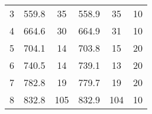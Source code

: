 \begin{table}[H]
\begin{tabular}{@{}cccccc@{}}
3                                 & 559.8                                                                                     & 35                                     & 558.9                                                                                     & 35                                     & 10                                                                                        \\
4                                 & 664.6                                                                                     & 30                                     & 664.9                                                                                     & 31                                     & 10                                                                                        \\
5                                 & 704.1                                                                                     & 14                                     & 703.8                                                                                     & 15                                     & 20                                                                                        \\
6                                 & 740.5                                                                                     & 14                                     & 739.1                                                                                     & 13                                     & 20                                                                                        \\
7                                 & 782.8                                                                                     & 19                                     & 779.7                                                                                     & 19                                     & 20                                                                                        \\
8                                 & 832.8                                                                                     & 105                                    & 832.9                                                                                     & 104                                    & 10                                                                                        \\

\end{tabular}
\end{table}
